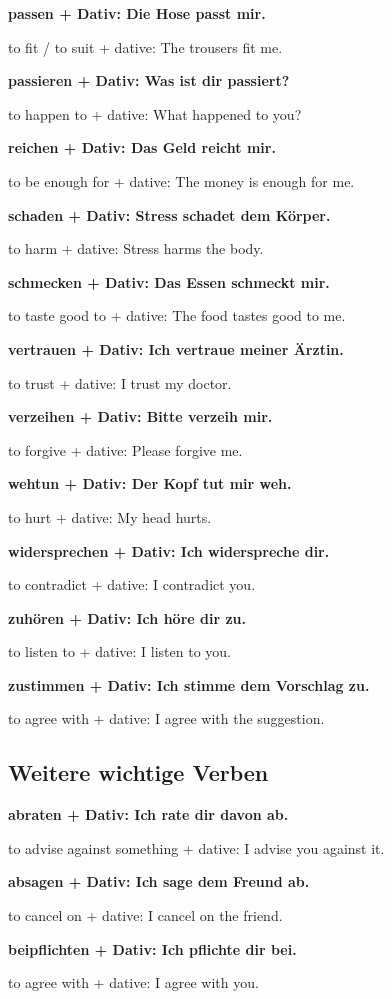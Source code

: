\documentclass[a4paper]{article}
\newcommand{\EN}[1]{\par{\small\textcolor{TranslationGray}{#1}}\vspace{0.4em}}
\begin{document}
            \textbf{passen + Dativ: Die Hose passt mir.}
            \EN{to fit / to suit + dative: The trousers fit me.}
            
            \textbf{passieren + Dativ: Was ist dir passiert?}
            \EN{to happen to + dative: What happened to you?}
            
            \textbf{reichen + Dativ: Das Geld reicht mir.}
            \EN{to be enough for + dative: The money is enough for me.}
            
            \textbf{schaden + Dativ: Stress schadet dem Körper.}
            \EN{to harm + dative: Stress harms the body.}
            
            \textbf{schmecken + Dativ: Das Essen schmeckt mir.}
            \EN{to taste good to + dative: The food tastes good to me.}
            
            \textbf{vertrauen + Dativ: Ich vertraue meiner Ärztin.}
            \EN{to trust + dative: I trust my doctor.}
            
            \textbf{verzeihen + Dativ: Bitte verzeih mir.}
            \EN{to forgive + dative: Please forgive me.}
            
            \textbf{wehtun + Dativ: Der Kopf tut mir weh.}
            \EN{to hurt + dative: My head hurts.}
            
            \textbf{widersprechen + Dativ: Ich widerspreche dir.}
            \EN{to contradict + dative: I contradict you.}
            
            \textbf{zuhören + Dativ: Ich höre dir zu.}
            \EN{to listen to + dative: I listen to you.}
            
            \textbf{zustimmen + Dativ: Ich stimme dem Vorschlag zu.}
            \EN{to agree with + dative: I agree with the suggestion.}
        
        \subsection{Weitere wichtige Verben}
            
            \textbf{abraten + Dativ: Ich rate dir davon ab.}
            \EN{to advise against something + dative: I advise you against it.}
            
            \textbf{absagen + Dativ: Ich sage dem Freund ab.}
            \EN{to cancel on + dative: I cancel on the friend.}
            
            \textbf{beipflichten + Dativ: Ich pflichte dir bei.}
            \EN{to agree with + dative: I agree with you.}
            
\end{document}
